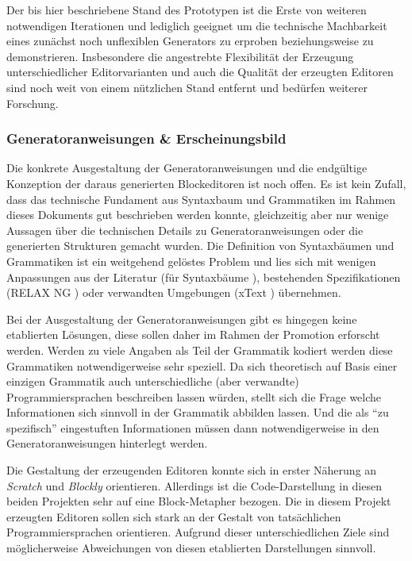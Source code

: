 \documentclass[paper=a4,fontsize=11pt,parskip=half]{scrartcl}
\begin{document}
Der bis hier beschriebene Stand des Prototypen ist die Erste von weiteren notwendigen Iterationen und lediglich geeignet um die technische Machbarkeit eines zunächst noch unflexiblen Generators zu erproben beziehungsweise zu demonstrieren. Insbesondere die angestrebte Flexibilität der Erzeugung unterschiedlicher Editorvarianten und auch die Qualität der erzeugten Editoren sind noch weit von einem nützlichen Stand entfernt und bedürfen weiterer Forschung.

\subsubsection{Generatoranweisungen \& Erscheinungsbild}

Die konkrete Ausgestaltung der Generatoranweisungen und die endgültige Konzeption der daraus generierten Blockeditoren ist noch offen. Es ist kein Zufall, dass das technische Fundament aus Syntaxbaum und Grammatiken im Rahmen dieses Dokuments gut beschrieben werden konnte, gleichzeitig aber nur wenige Aussagen über die technischen Details zu Generatoranweisungen oder die generierten Strukturen gemacht wurden. Die Definition von Syntaxbäumen und Grammatiken ist ein weitgehend gelöstes Problem und lies sich mit wenigen Anpassungen aus der Literatur (für Syntaxbäume \cite{aho_compilers:_2007}), bestehenden Spezifikationen (RELAX NG \cite{clark_relax_2001}) oder verwandten Umgebungen (xText \cite{efftinge_oaw_2006}) übernehmen.

Bei der Ausgestaltung der Generatoranweisungen gibt es hingegen keine etablierten Lösungen, diese sollen daher im Rahmen der Promotion erforscht werden. Werden zu viele Angaben als Teil der Grammatik kodiert werden diese Grammatiken notwendigerweise sehr speziell. Da sich theoretisch auf Basis einer einzigen Grammatik auch unterschiedliche (aber verwandte) Programmiersprachen beschreiben lassen würden, stellt sich die Frage welche Informationen sich sinnvoll in der Grammatik abbilden lassen. Und die als \enquote{zu spezifisch} eingestuften Informationen müssen dann notwendigerweise in den Generatoranweisungen hinterlegt werden.

Die Gestaltung der erzeugenden Editoren konnte sich in erster Näherung an \textit{Scratch} \cite{maloney_scratch:_2004} und \textit{Blockly} \cite{fraser_ten_2015} orientieren. Allerdings ist die Code-Darstellung in diesen beiden Projekten sehr auf eine Block-Metapher bezogen. Die in diesem Projekt erzeugten Editoren sollen sich stark an der Gestalt von tatsächlichen Programmiersprachen orientieren. Aufgrund dieser unterschiedlichen Ziele sind möglicherweise Abweichungen von diesen etablierten Darstellungen sinnvoll.
\end{document}

